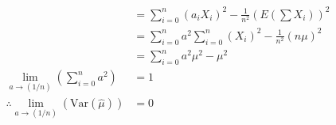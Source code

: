 \documentclass{article}
\newcommand{\var}{\text{Var}}
\begin{document}
\begin{enumerate}[\quad(a)]
\begin{align*}
			&= \sum_{i=0}^n(a_iX_i)^2 - \frac{1}{n^2} \left(E\left(\sum X_i\right)\right)^2\\
			&= \sum_{i=0}^n a^2 \sum_{i=0}^n(X_i)^2 - \frac{1}{n^2} \left( n \mu \right)^2\\
			&= \sum_{i=0}^n a^2 \mu^2 - \mu^2\\
			\lim\limits_{a \rightarrow (1/n)} \left( \sum_{i=0}^n a^2 \right) &= 1\\
			\therefore \lim\limits_{a \rightarrow (1/n)} \left( \var(\hat{\mu}) \right) &= 0\\
		\end{align*}
	\end{enumerate}
\end{document}
